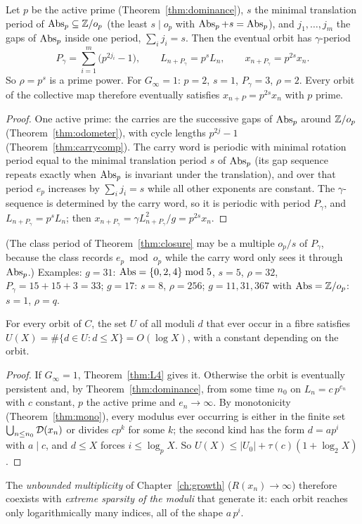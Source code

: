 \begin{theorem}\label{thm:rho}
Let \(p\) be the active prime (Theorem~\ref{thm:dominance}), \(s\) the minimal translation period of \(\operatorname{Abs}_p\subseteq\mathbb{Z}/o_p\) (the least \(s\mid o_p\) with \(\operatorname{Abs}_p+s=\operatorname{Abs}_p\)), and \(j_1,\dots,j_m\) the gaps of \(\operatorname{Abs}_p\) inside one period, \(\sum_ij_i=s\). Then the eventual orbit has \(\gamma\)-period
\[
P_\gamma=\sum_{i=1}^m\big(p^{2j_i}-1\big),\qquad L_{n+P_\gamma}=p^sL_n,\qquad x_{n+P_\gamma}=p^{2s}x_n.
\]
So \(\rho=p^s\) is a prime power. For \(G_\infty=1\): \(p=2\), \(s=1\), \(P_\gamma=3\), \(\rho=2\). Every orbit of the collective map therefore eventually satisfies \(x_{n+P}=p^{2s}x_n\) with \(p\) prime.
\end{theorem}
\begin{proof}
One active prime: the carries are the successive gaps of \(\operatorname{Abs}_p\) around \(\mathbb{Z}/o_p\) (Theorem~\ref{thm:odometer}), with cycle lengths \(p^{2j}-1\) (Theorem~\ref{thm:carrycomp}). The carry word is periodic with minimal rotation period equal to the minimal translation period \(s\) of \(\operatorname{Abs}_p\) (its gap sequence repeats exactly when \(\operatorname{Abs}_p\) is invariant under the translation), and over that period \(e_p\) increases by \(\sum_ij_i=s\) while all other exponents are constant. The \(\gamma\)-sequence is determined by the carry word, so it is periodic with period \(P_\gamma\), and \(L_{n+P_\gamma}=p^sL_n\); then \(x_{n+P_\gamma}=\gamma L_{n+P_\gamma}^2/g=p^{2s}x_n\).
\end{proof}

(The class period of Theorem~\ref{thm:closure} may be a multiple \(o_p/s\) of \(P_\gamma\), because the class records \(e_p\bmod o_p\) while the carry word only sees it through \(\operatorname{Abs}_p\).) Examples: \(g=31\): \(\operatorname{Abs}=\{0,2,4\}\bmod5\), \(s=5\), \(\rho=32\), \(P_\gamma=15+15+3=33\); \(g=17\): \(s=8\), \(\rho=256\); \(g=11,31,367\) with \(\operatorname{Abs}=\mathbb{Z}/o_p\): \(s=1\), \(\rho=q\).

\begin{corollary}\label{cor:logreach}
For every orbit of \(C\), the set \(U\) of all moduli \(d\) that ever occur in a fibre satisfies \(U(X)=\#\{d\in U:d\le X\}=O(\log X)\), with a constant depending on the orbit.
\end{corollary}
\begin{proof}
If \(G_\infty=1\), Theorem~\ref{thm:L4} gives it. Otherwise the orbit is eventually persistent and, by Theorem~\ref{thm:dominance}, from some time \(n_0\) on \(L_n=c\,p^{e_n}\) with \(c\) constant, \(p\) the active prime and \(e_n\to\infty\). By monotonicity (Theorem~\ref{thm:mono}), every modulus ever occurring is either in the finite set \(\bigcup_{n\le n_0}\mathcal{D}(x_n)\) or divides \(cp^k\) for some \(k\); the second kind has the form \(d=ap^i\) with \(a\mid c\), and \(d\le X\) forces \(i\le\log_pX\). So \(U(X)\le|U_0|+\tau(c)(1+\log_2X)\).
\end{proof}
The \emph{unbounded multiplicity} of Chapter~\ref{ch:growth} (\(R(x_n)\to\infty\)) therefore coexists with \emph{extreme sparsity of the moduli} that generate it: each orbit reaches only logarithmically many indices, all of the shape \(a\,p^i\).

